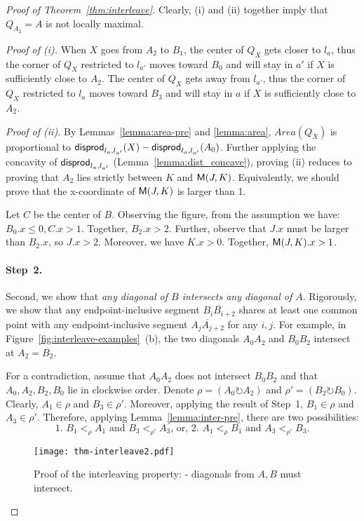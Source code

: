 \documentclass{ws-ijcga}
\begin{document}
\begin{proof}[Proof of Theorem~\ref{thm:interleave}]
Clearly, (i) and (ii) together imply that $Q_{A_2}=A$ is not locally maximal.

\smallskip \noindent \emph{Proof of (i).} When $X$ goes from $A_2$ to $B_1$, the center of $Q_X$ gets closer to $l_a$,
  thus the corner of $Q_X$ restricted to $l_{a'}$ moves toward $B_0$ and will stay in $a'$ if $X$ is sufficiently close to $A_2$.
  The center of $Q_X$ gets away from $l_{a'}$, thus the corner of $Q_X$ restricted to $l_{a}$ moves toward $B_3$ and will stay in $a$ if $X$ is sufficiently close to $A_2$.

\medskip \noindent \emph{Proof of (ii).} By Lemmas~\ref{lemma:area-pre} and \ref{lemma:area},
  $Area(Q_X)$ is proportional to $\mathsf{disprod}_{l_a,l_{a'}}(X)-\mathsf{disprod}_{l_a,l_{a'}}(A_0)$.
Further applying the concavity of $\mathsf{disprod}_{l_a,l_{a'}}$ (Lemma~\ref{lemma:dist_concave}),
  proving (ii) reduces to proving that $A_2$ lies strictly between $K$ and $\mathsf{M}(J,K)$.
  Equivalently, we should prove that the x-coordinate of $\mathsf{M}(J,K)$ is larger than 1.

  Let $C$ be the center of $B$.
  Observing the figure, from the assumption we have:
  $B_0.x\leq 0,C.x>1$. Together, $B_2.x>2$. Further, observe that $J.x$ must be larger than $B_2.x$, so $J.x>2$.
  Moreover, we have $K.x>0$. Together, $\mathsf{M}(J,K).x>1$.

\paragraph{Step~2.} Second, we show that \emph{any diagonal of $B$ intersects any diagonal of $A$}.
Rigorously, we show that any endpoint-inclusive segment $\overline{B_iB_{i+2}}$ shares at least one common point with any endpoint-inclusive segment $\overline{A_jA_{j+2}}$ for any $i,j$.
For example, in Figure~\ref{fig:interleave-examples}~(b), the two diagonals $A_0A_2$ and $B_0B_2$ intersect at $A_2=B_2$.

\smallskip For a contradiction, assume that $A_0A_2$ does not intersect $B_0B_2$ and that $A_0,A_2,B_2,B_0$ lie in clockwise order.
Denote $\rho=(A_0\circlearrowright A_2)$ and $\rho'=(B_2\circlearrowright B_0)$.
Clearly, $A_1\in \rho$ and $B_3\in \rho'$.
Moreover, applying the result of Step~1, $B_1\in \rho$ and $A_3\in\rho'$.
Therefore, applying Lemma~\ref{lemma:inter-pre}, there are two possibilities:
$$\text{1. $B_1<_\rho A_1$ and $B_3<_{\rho'}A_3$, or, 2. $A_1<_\rho B_1$ and $A_3<_{\rho'} B_3$.}$$


\begin{figure}[h]
\centering\texttt{[image: thm-interleave2.pdf]}
\caption{Proof of the interleaving property: - diagonals from $A,B$ must intersect.}\label{fig:interleave2}
\end{figure}


\end{proof}
\end{document}
